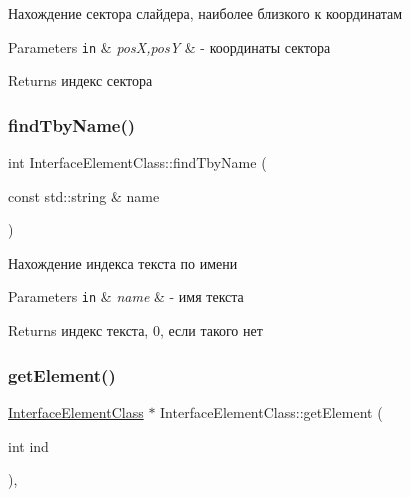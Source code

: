 Нахождение сектора слайдера, наиболее близкого к координатам 


\begin{DoxyParams}[1]{Parameters}
\mbox{\tt in}  & {\em posX,posY} & -\/ координаты сектора \\
\hline
\end{DoxyParams}
\begin{DoxyReturn}{Returns}
индекс сектора 
\end{DoxyReturn}
\mbox{\label{class_interface_element_class_a2d7805e3c6f80068b76618e3ad43f31f}} 
\subsubsection{\texorpdfstring{find\+Tby\+Name()}{findTbyName()}}
{\footnotesize\ttfamily int Interface\+Element\+Class\+::find\+Tby\+Name (\begin{DoxyParamCaption}\item[{const std\+::string \&}]{name }\end{DoxyParamCaption})\hspace{0.3cm}{\ttfamily [inherited]}}



Нахождение индекса текста по имени 


\begin{DoxyParams}[1]{Parameters}
\mbox{\tt in}  & {\em name} & -\/ имя текста \\
\hline
\end{DoxyParams}
\begin{DoxyReturn}{Returns}
индекс текста, 0, если такого нет 
\end{DoxyReturn}
\mbox{\label{class_interface_element_class_aee5a321eaf772ef561bab59b51fb36b9}} 
\subsubsection{\texorpdfstring{get\+Element()}{getElement()}}
{\footnotesize\ttfamily \hyperlink{class_interface_element_class}{Interface\+Element\+Class} $\ast$ Interface\+Element\+Class\+::get\+Element (\begin{DoxyParamCaption}\item[{int}]{ind }\end{DoxyParamCaption})\hspace{0.3cm}{\ttfamily [virtual]}, {\ttfamily [inherited]}}



